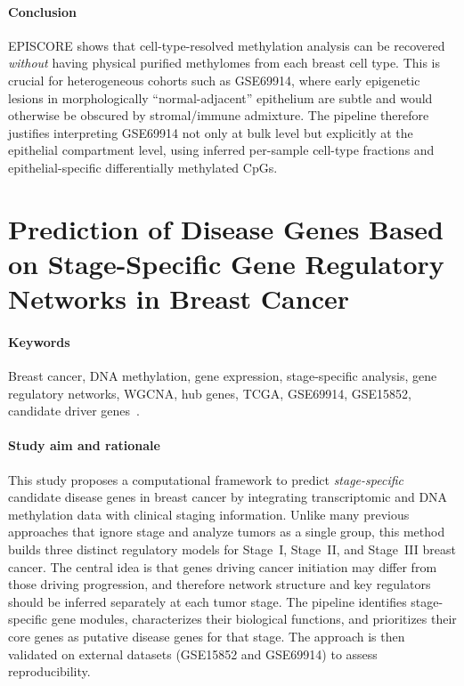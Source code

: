 \documentclass[10pt]{extarticle}
\begin{document}
\paragraph{Conclusion}
EPISCORE shows that cell-type-resolved methylation analysis can be recovered \textit{without} having physical purified methylomes from each breast cell type. This is crucial for heterogeneous cohorts such as GSE69914, where early epigenetic lesions in morphologically ``normal-adjacent'' epithelium are subtle and would otherwise be obscured by stromal/immune admixture. The pipeline therefore justifies interpreting GSE69914 not only at bulk level but explicitly at the epithelial compartment level, using inferred per-sample cell-type fractions and epithelial-specific differentially methylated CpGs.




\section{Prediction of Disease Genes Based on Stage-Specific Gene Regulatory Networks in Breast Cancer}

\paragraph{Keywords}
Breast cancer, DNA methylation, gene expression, stage-specific analysis, gene regulatory networks, WGCNA, hub genes, TCGA, GSE69914, GSE15852, candidate driver genes~\cite{fan2021stagegrn}.

\paragraph{Study aim and rationale}
This study proposes a computational framework to predict \textit{stage-specific} candidate disease genes in breast cancer by integrating transcriptomic and DNA methylation data with clinical staging information. Unlike many previous approaches that ignore stage and analyze tumors as a single group, this method builds three distinct regulatory models for Stage~I, Stage~II, and Stage~III breast cancer. The central idea is that genes driving cancer initiation may differ from those driving progression, and therefore network structure and key regulators should be inferred separately at each tumor stage. The pipeline identifies stage-specific gene modules, characterizes their biological functions, and prioritizes their core genes as putative disease genes for that stage. The approach is then validated on external datasets (GSE15852 and GSE69914) to assess reproducibility.
\end{document}
